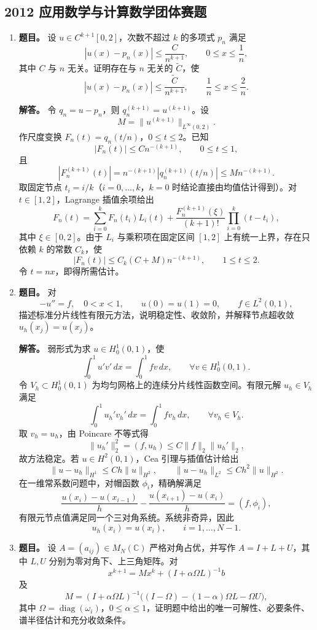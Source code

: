 ﻿\documentclass[UTF8,12pt]{ctexart}
\begin{document}
\subsection{2012 应用数学与计算数学团体赛题}
\begin{enumerate}[label=\textbf{\arabic*.},leftmargin=2.2em]
\item \textbf{题目。} 设 \(u\in C^{k+1}[0,2]\)，次数不超过 \(k\) 的多项式 \(p_n\) 满足
\[
|u(x)-p_n(x)|\le \frac{C}{n^{k+1}},\qquad 0\le x\le \frac1n,
\]
其中 \(C\) 与 \(n\) 无关。证明存在与 \(n\) 无关的 \(\widetilde C\)，使
\[
|u(x)-p_n(x)|\le \frac{\widetilde C}{n^{k+1}},\qquad \frac1n\le x\le \frac2n.
\]

\textbf{解答。} 令 \(q_n=u-p_n\)，则 \(q_n^{(k+1)}=u^{(k+1)}\)。设
\[
M=\|u^{(k+1)}\|_{L^\infty(0,2)}.
\]
作尺度变换 \(F_n(t)=q_n(t/n)\)，\(0\le t\le2\)。已知
\[
|F_n(t)|\le Cn^{-(k+1)},\qquad 0\le t\le1,
\]
且
\[
|F_n^{(k+1)}(t)|=n^{-(k+1)}|q_n^{(k+1)}(t/n)|
\le Mn^{-(k+1)}.
\]
取固定节点 \(t_i=i/k\)（\(i=0,\ldots,k\)，\(k=0\) 时结论直接由均值估计得到）。对 \(t\in[1,2]\)，Lagrange 插值余项给出
\[
F_n(t)=\sum_{i=0}^kF_n(t_i)L_i(t)
+\frac{F_n^{(k+1)}(\xi)}{(k+1)!}\prod_{i=0}^k(t-t_i),
\]
其中 \(\xi\in[0,2]\)。由于 \(L_i\) 与乘积项在固定区间 \([1,2]\) 上有统一上界，存在只依赖 \(k\) 的常数 \(C_k\)，使
\[
|F_n(t)|\le C_k(C+M)n^{-(k+1)},\qquad 1\le t\le2.
\]
令 \(t=nx\)，即得所需估计。

\item \textbf{题目。} 对
\[
-u''=f,\quad 0<x<1,\qquad u(0)=u(1)=0,\qquad f\in L^2(0,1),
\]
描述标准分片线性有限元方法，说明稳定性、收敛阶，并解释节点超收敛 \(u_h(x_j)=u(x_j)\)。

\textbf{解答。} 弱形式为求 \(u\in H_0^1(0,1)\)，使
\[
\int_0^1u'v'\,dx=\int_0^1fv\,dx,\qquad \forall v\in H_0^1(0,1).
\]
令 \(V_h\subset H_0^1(0,1)\) 为均匀网格上的连续分片线性函数空间。有限元解 \(u_h\in V_h\) 满足
\[
\int_0^1u_h'v_h'\,dx=\int_0^1fv_h\,dx,\qquad \forall v_h\in V_h.
\]
取 \(v_h=u_h\)，由 Poincare 不等式得
\[
\|u_h'\|_2^2=(f,u_h)\le C\|f\|_2\|u_h'\|_2,
\]
故方法稳定。若 \(u\in H^2(0,1)\)，Cea 引理与插值估计给出
\[
\|u-u_h\|_{H^1}\le Ch\|u\|_{H^2},\qquad
\|u-u_h\|_{L^2}\le Ch^2\|u\|_{H^2}.
\]
在一维常系数问题中，对帽函数 \(\phi_i\)，精确解满足
\[
\frac{u(x_i)-u(x_{i-1})}{h}-\frac{u(x_{i+1})-u(x_i)}{h}
=(f,\phi_i),
\]
有限元节点值满足同一个三对角系统。系统非奇异，因此
\[
u_h(x_i)=u(x_i),\qquad i=1,\ldots,N-1.
\]

\item \textbf{题目。} 设 \(A=(a_{ij})\in M_N(\mathbb C)\) 严格对角占优，并写作 \(A=I+L+U\)，其中 \(L,U\) 分别为零对角下、上三角矩阵。对
\[
x^{k+1}=Mx^k+(I+\alpha\Omega L)^{-1}b
\]
及
\[
M=(I+\alpha\Omega L)^{-1}\bigl((I-\Omega)-(1-\alpha)\Omega L-\Omega U\bigr),
\]
其中 \(\Omega=\operatorname{diag}(\omega_i)\)，\(0\le\alpha\le1\)，证明题中给出的唯一可解性、必要条件、谱半径估计和充分收敛条件。


\end{enumerate}
\end{document}
